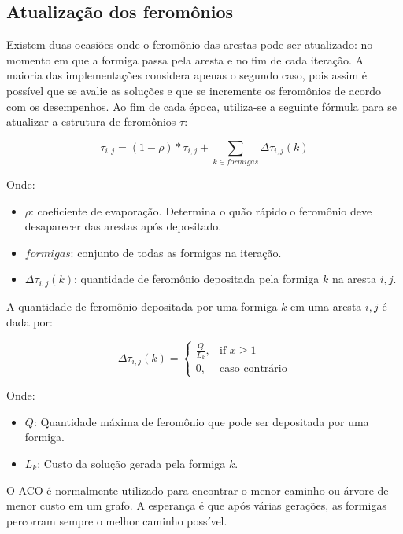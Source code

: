 \subsection{Atualização dos feromônios}
Existem duas ocasiões onde o feromônio das arestas pode ser atualizado: no momento em que a formiga passa pela aresta e no fim de cada iteração. A maioria das implementações considera apenas o segundo caso, pois assim é possível que se avalie as soluções e que se incremente os feromônios de acordo com os desempenhos. Ao fim de cada época, utiliza-se a seguinte fórmula para se atualizar a estrutura de feromônios $\tau$:

\[ \tau_{i,j} = (1 - \rho) * \tau_{i,j} + \sum_{k \in formigas} \Delta\tau_{i,j}(k)\]

Onde:

\begin{itemize}  
	\item $\rho$: coeficiente de evaporação. Determina o quão rápido o feromônio deve desaparecer das arestas após depositado.
	\item $formigas$: conjunto de todas as formigas na iteração.
	\item $\Delta\tau_{i,j}(k)$: quantidade de feromônio depositada pela formiga $k$ na aresta $i,j$.
\end{itemize}

A quantidade de feromônio depositada por uma formiga $k$ em uma aresta $i,j$ é dada por:

\[ \Delta\tau_{i,j}(k) = \begin{cases} \frac{Q}{L_k},& \text{if } x\geq 1\\ 0,& \text{caso contrário} \end{cases} \]

Onde:

\begin{itemize}  
	\item $Q$: Quantidade máxima de feromônio que pode ser depositada por uma formiga.
	\item $L_k$: Custo da solução gerada pela formiga  $k$.
\end{itemize}

O ACO é normalmente utilizado para encontrar o menor caminho ou árvore de menor custo em um grafo. A esperança é que após várias gerações, as formigas percorram sempre o melhor caminho possível.


